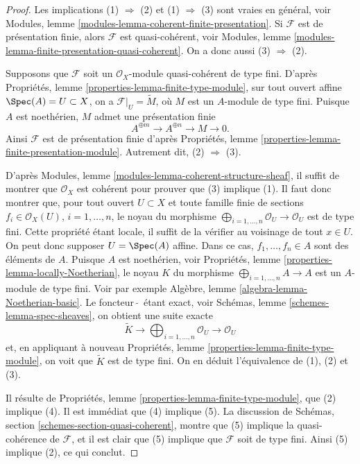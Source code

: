 \begin{proof}
Les implications (1) $\Rightarrow$ (2) et (1) $\Rightarrow$ (3) sont
vraies en général, voir
Modules, lemme \ref{modules-lemma-coherent-finite-presentation}.
Si $\mathcal{F}$ est de présentation finie, alors $\mathcal{F}$ est
quasi-cohérent, voir
Modules, lemme \ref{modules-lemma-finite-presentation-quasi-coherent}. On
a donc aussi (3) $\Rightarrow$ (2).

\medskip\noindent
Supposons que $\mathcal{F}$ soit un $\mathcal{O}_X$-module quasi-cohérent
de type
fini. D'après Propriétés, lemme \ref{properties-lemma-finite-type-module},
sur tout ouvert affine
$\Spec(A) = U \subset X$, on a $\mathcal{F}|_U = \widetilde M$,
où $M$ est un $A$-module de type fini. Puisque $A$ est noethérien,
$M$ admet une présentation finie
$$
A^{\oplus m} \to A^{\oplus n} \to M \to 0.
$$
Ainsi $\mathcal{F}$ est de présentation finie d'après
Propriétés, lemme \ref{properties-lemma-finite-presentation-module}.
Autrement dit, (2) $\Rightarrow$ (3).

\medskip\noindent
D'après Modules, lemme \ref{modules-lemma-coherent-structure-sheaf}, il
suffit de montrer que $\mathcal{O}_X$ est cohérent pour prouver que (3) implique
(1). Il faut donc montrer que, pour tout ouvert $U \subset X$ et
toute famille finie de sections $f_i \in \mathcal{O}_X(U)$,
$i = 1, \ldots, n$, le noyau du morphisme
$\bigoplus_{i = 1, \ldots, n} \mathcal{O}_U \to \mathcal{O}_U$
est de type fini. Cette propriété étant locale, il suffit
de la vérifier au voisinage de tout $x \in U$.
On peut donc supposer $U = \Spec(A)$ affine. Dans ce cas,
$f_1, \ldots, f_n \in A$ sont des éléments de $A$. Puisque $A$ est
noethérien, voir
Propriétés, lemme \ref{properties-lemma-locally-Noetherian},
le noyau $K$ du morphisme $\bigoplus_{i = 1, \ldots, n} A \to A$
est un $A$-module de type fini. Voir par
exemple Algèbre, lemme \ref{algebra-lemma-Noetherian-basic}.
Le foncteur\ $\widetilde{ }$\ étant exact, voir
Schémas, lemme \ref{schemes-lemma-spec-sheaves},
on obtient une suite exacte
$$
\widetilde K \to
\bigoplus\nolimits_{i = 1, \ldots, n} \mathcal{O}_U \to
\mathcal{O}_U
$$
et, en appliquant à
nouveau Propriétés, lemme \ref{properties-lemma-finite-type-module},
on voit que $\widetilde K$ est de type fini. On en
déduit l'équivalence de (1), (2) et (3).

\medskip\noindent
Il résulte de
Propriétés, lemme \ref{properties-lemma-finite-type-module},
que (2) implique (4). Il est immédiat que (4) implique (5).
La discussion de
Schémas, section \ref{schemes-section-quasi-coherent},
montre que (5) implique la
quasi-cohérence de $\mathcal{F}$, et il est clair que (5)
implique que $\mathcal{F}$ soit de type fini. Ainsi (5) implique
(2), ce qui conclut.
\end{proof}

